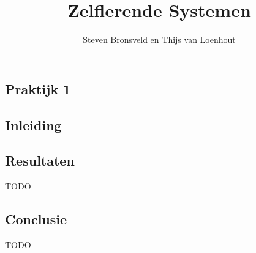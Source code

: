 \documentclass[a4paper,titlepage]{article}
\title{Zelflerende Systemen}
\author{Steven Bronsveld en Thijs van Loenhout}
\begin{document}
\textcolor{praktijk}{
	\section{Praktijk 1}
}


\subsection{Inleiding}

\subsection{Resultaten}
TODO

\subsection{Conclusie}
TODO
\end{document}
